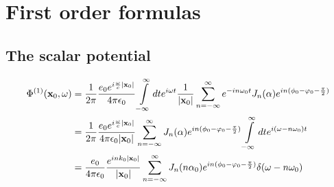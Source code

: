 \section{First order formulas}

\subsection{The scalar potential}
\begin{align}
    \Phi^{(1)}({\bf x}_0,\omega) & =\frac1{2\pi}\frac{e_0 e^{i\frac{\omega}c|{\bf x}_0|}}{4\pi\epsilon_0}\int\limits_{-\infty}^{\infty}dte^{i\omega t} \frac1{|{\bf x}_0|}\sum\limits_{n=-\infty}^{\infty} e^{-i n \omega_0 t}J_n(\alpha) e^{in(\phi_0-\varphi_0-\frac{\pi}2)}\nonumber \\
                                 & =\frac1{2\pi}\frac{e_0 e^{i\frac{\omega}c|{\bf x}_0|}}{4\pi\epsilon_0|{\bf x}_0|}\sum\limits_{n=-\infty}^{\infty}J_n(\alpha) e^{in(\phi_0-\varphi_0-\frac{\pi}2)}\int\limits_{-\infty}^{\infty}dte^{i(\omega-n\omega_0)t}\nonumber                   \\
                                 & =\frac{e_0}{4\pi\epsilon_0} \frac{e^{ink_0|{\bf x}_0|}}{|{\bf x}_0|}\sum\limits_{n=-\infty}^{\infty}J_n(n\alpha_0) e^{in(\phi_0-\varphi_0-\frac{\pi}2)}\delta(\omega-n\omega_0)
\end{align}

